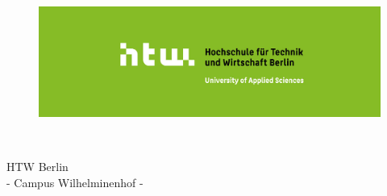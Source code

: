 \thispagestyle{empty}


\begin{figure}[t]
 \centering
 \includegraphics[width=1\textwidth]{abb/logo1}

\end{figure}


\begin{verbatim}


\end{verbatim}

\begin{center}
\Large{HTW Berlin}\\
\Large{- Campus Wilhelminenhof -}\\
\end{center}


